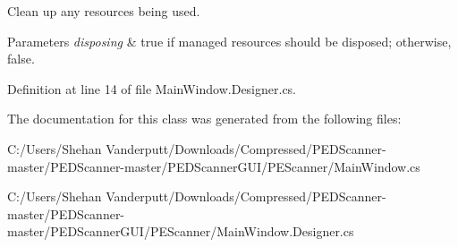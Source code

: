 Clean up any resources being used. 


\begin{DoxyParams}{Parameters}
{\em disposing} & true if managed resources should be disposed; otherwise, false.\\
\hline
\end{DoxyParams}


Definition at line 14 of file Main\+Window.\+Designer.\+cs.



The documentation for this class was generated from the following files\+:\begin{DoxyCompactItemize}
\item 
C\+:/\+Users/\+Shehan Vanderputt/\+Downloads/\+Compressed/\+P\+E\+D\+Scanner-\/master/\+P\+E\+D\+Scanner-\/master/\+P\+E\+D\+Scanner\+G\+U\+I/\+P\+E\+Scanner/Main\+Window.\+cs\item 
C\+:/\+Users/\+Shehan Vanderputt/\+Downloads/\+Compressed/\+P\+E\+D\+Scanner-\/master/\+P\+E\+D\+Scanner-\/master/\+P\+E\+D\+Scanner\+G\+U\+I/\+P\+E\+Scanner/Main\+Window.\+Designer.\+cs\end{DoxyCompactItemize}
